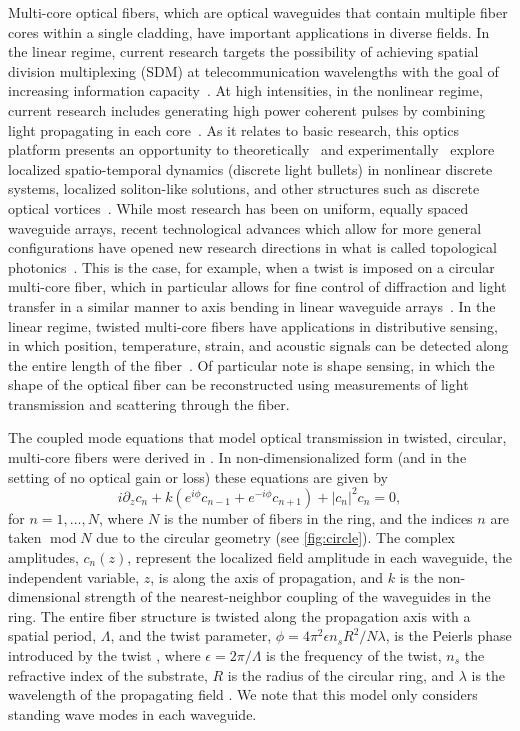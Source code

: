 \documentclass[11pt,reqno]{amsart}
\DeclareMathOperator{\md}{mod}
\begin{document}
Multi-core optical fibers, which are optical waveguides that contain multiple fiber cores within a single cladding, have important applications in diverse fields. In the linear regime, current research targets the possibility of achieving spatial division multiplexing (SDM) at telecommunication wavelengths with the goal of increasing information capacity~\cite{azadeh}. At high intensities, in the nonlinear regime, current research includes generating high power coherent pulses by combining light propagating in each core~\cite{balakin}. As it relates to basic research, this optics platform presents an opportunity to  theoretically~\cite{ace} and experimentally~\cite{minardi} explore localized spatio-temporal dynamics (discrete light bullets) in nonlinear discrete systems, localized soliton-like solutions, and  other structures such as discrete optical vortices~\cite{pryamikov}. While most  research has been on uniform, equally spaced waveguide arrays, recent technological advances which allow for more general configurations have opened new research directions in what is called topological photonics~\cite{ozawa}. This is the case, for example, when a twist is imposed on a circular multi-core fiber, which in particular allows for fine control of diffraction and light transfer in a similar manner to axis bending in linear waveguide arrays~\cite{Longhi2005}. In the linear regime, 
twisted multi-core fibers have applications in distributive sensing, in which position, temperature, strain, and acoustic signals can be detected along the entire length of the fiber~\cite{Gannot2014,Westbrook2017}. Of particular note is shape sensing, in which the shape of the optical fiber can be reconstructed using measurements of light transmission and scattering through the fiber.

The coupled mode equations that model optical transmission in twisted, circular, multi-core fibers were derived in \cite{Longhi2007,Longhi2007b,Garanovich2012}. In non-dimensionalized form (and in the setting of no optical gain or loss) these equations are given by
\begin{equation}\label{eq:coupledmode}
i \partial_z c_n + k \left(e^{i\phi}c_{n-1} + e^{-i\phi}c_{n+1} \right) + |c_n|^2 c_n = 0,
\end{equation}
for $n = 1, \dots, N$, where $N$ is the number of fibers in the ring, and the indices $n$ are taken $\md N$ due to the circular geometry (see \cref{fig:circle}).
The complex amplitudes, $c_n(z)$, represent the localized field amplitude in each waveguide, the independent variable, $z$, is along the axis of propagation, and $k$ is the non-dimensional strength of the nearest-neighbor coupling of the waveguides in the ring. The entire fiber structure is twisted along the propagation axis with a spatial period, $\Lambda$, and the twist parameter, $\phi = 4 \pi^2 \epsilon n_s R^2/N \lambda$, is the Peierls phase introduced by the twist \cite{Longhi2007,Peierls1933}, where $\epsilon = 2 \pi / \Lambda$ is the frequency of the twist, $n_s$ the refractive index of the substrate, $R$ is the radius of the circular ring, and $\lambda$ is the wavelength of the propagating field \cite{castro2016,Parto2017}. We note that this model only considers standing wave modes in each waveguide.  
\end{document}
